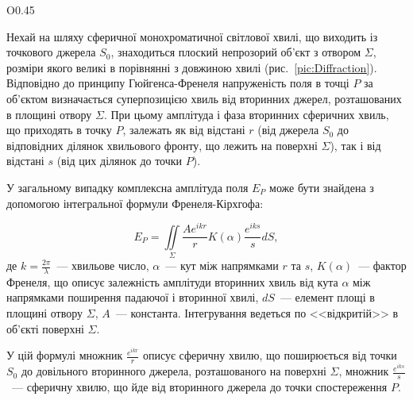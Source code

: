 \begin{wrapfigure}{O}{0.45\linewidth}
	\centering
	\caption{Ілюстрація}
	\label{pic:Diffraction}
\end{wrapfigure}
Нехай на шляху сферичної монохроматичної світлової хвилі, що виходить із точкового джерела $S_0$, знаходиться плоский непрозорий об'єкт з отвором $\Sigma$, розміри якого великі в порівнянні з довжиною хвилі (рис.~\ref{pic:Diffraction}). Відповідно до принципу Гюйгенса-Френеля напруженість поля в точці $P$ за об'єктом визначається суперпозицією хвиль від вторинних джерел, розташованих в площині отвору $\Sigma$. При цьому амплітуда і фаза вторинних
сферичних хвиль, що приходять в точку $P$, залежать як від відстані $r$ (від джерела $S_0$ до відповідних ділянок хвильового фронту, що лежить на поверхні $\Sigma$), так і від відстані $s$ (від цих ділянок до точки $P$).

У загальному випадку комплексна амплітуда поля $E_P$ може бути знайдена з
допомогою інтегральної формули Френеля-Кірхгофа:

\begin{equation}\label{eq:Fr-Kirch}
    E_P = \iint\limits_{\Sigma}  \frac{A e^{ikr}}{r}K(\alpha) \frac{e^{iks}}{s} dS,
\end{equation}
де $k = \frac{2\pi}{\lambda}$~--- хвильове число, $\alpha$~--- кут між напрямками $r$ та $s$, $K(\alpha)$~--- фактор Френеля, що описує залежність амплітуди вторинних хвиль від кута $\alpha$ між напрямками поширення падаючої і вторинної хвилі, $dS$~--- елемент площі в площині отвору $\Sigma$,  $A$~--- константа. Інтегрування ведеться по <<відкритій>> в об'єкті поверхні $\Sigma$.

У цій формулі множник $\frac{e^{ikr}}{r}$ описує сферичну хвилю, що поширюється від точки $S_0$ до довільного вторинного джерела, розташованого на поверхні $\Sigma$, множник $\frac{e^{iks}}{s}$~--- сферичну хвилю, що йде від вторинного джерела до точки спостереження $P$.

